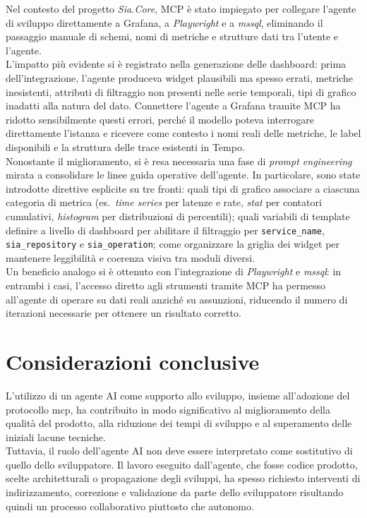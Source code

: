 Nel contesto del progetto \emph{Sia.Core}, MCP è stato impiegato per collegare l'agente
di sviluppo direttamente a Grafana, a \emph{Playwright} e a \emph{mssql}, eliminando il
passaggio manuale di schemi, nomi di metriche e strutture dati tra l'utente e l'agente.\\
L'impatto più evidente si è registrato nella generazione delle dashboard: prima
dell'integrazione, l'agente produceva widget plausibili ma spesso errati, metriche
inesistenti, attributi di filtraggio non presenti nelle serie temporali, tipi di grafico
inadatti alla natura del dato. Connettere l'agente a Grafana tramite MCP ha ridotto
sensibilmente questi errori, perché il modello poteva interrogare direttamente l'istanza
e ricevere come contesto i nomi reali delle metriche, le label disponibili e la struttura
delle trace esistenti in Tempo.\\
Nonostante il miglioramento, si è resa necessaria una fase di \emph{prompt engineering}
mirata a consolidare le linee guida operative dell'agente. In particolare, sono state
introdotte direttive esplicite su tre fronti: quali tipi di grafico associare a ciascuna
categoria di metrica (es.\ \emph{time series} per latenze e rate, \emph{stat} per
contatori cumulativi, \emph{histogram} per distribuzioni di percentili); quali variabili
di template definire a livello di dashboard per abilitare il filtraggio per
\texttt{service\_name}, \texttt{sia\_repository} e \texttt{sia\_operation}; come
organizzare la griglia dei widget per mantenere leggibilità e coerenza visiva tra moduli
diversi.\\
Un beneficio analogo si è ottenuto con l'integrazione di \emph{Playwright} e
\emph{mssql}: in entrambi i casi, l'accesso diretto agli strumenti tramite MCP ha
permesso all'agente di operare su dati reali anziché su assunzioni, riducendo il numero
di iterazioni necessarie per ottenere un risultato corretto.

\section{Considerazioni conclusive}

L’utilizzo di un agente AI come supporto allo sviluppo, insieme all’adozione del protocollo \gls{mcp}, 
ha contribuito in modo significativo al miglioramento della qualità del prodotto, 
alla riduzione dei tempi di sviluppo e al superamento delle iniziali lacune tecniche.\\
Tuttavia, il ruolo dell’agente AI non deve essere interpretato come sostitutivo di quello dello sviluppatore.
Il lavoro eseguito dall'agente, che fosse codice prodotto, scelte architetturali
o propagazione degli sviluppi, ha spesso richiesto interventi di indirizzamento, correzione e validazione
da parte dello sviluppatore risultando quindi un processo collaborativo piuttosto che autonomo.